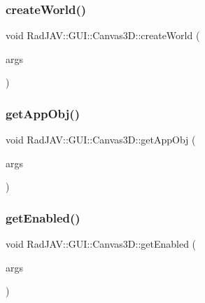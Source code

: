 \subsubsection{\texorpdfstring{create\+World()}{createWorld()}}
{\footnotesize\ttfamily void Rad\+J\+A\+V\+::\+G\+U\+I\+::\+Canvas3\+D\+::create\+World (\begin{DoxyParamCaption}\item[{const v8\+::\+Function\+Callback\+Info$<$ v8\+::\+Value $>$ \&}]{args }\end{DoxyParamCaption})\hspace{0.3cm}{\ttfamily [static]}}

\mbox{\label{class_rad_j_a_v_1_1_g_u_i_1_1_canvas3_d_af873318dd5011d56be49084e2fa8abfd}} 
\subsubsection{\texorpdfstring{get\+App\+Obj()}{getAppObj()}}
{\footnotesize\ttfamily void Rad\+J\+A\+V\+::\+G\+U\+I\+::\+Canvas3\+D\+::get\+App\+Obj (\begin{DoxyParamCaption}\item[{const v8\+::\+Function\+Callback\+Info$<$ v8\+::\+Value $>$ \&}]{args }\end{DoxyParamCaption})\hspace{0.3cm}{\ttfamily [static]}}

\mbox{\label{class_rad_j_a_v_1_1_g_u_i_1_1_canvas3_d_ac8b768c038924e40ae05d8057d061de4}} 
\subsubsection{\texorpdfstring{get\+Enabled()}{getEnabled()}}
{\footnotesize\ttfamily void Rad\+J\+A\+V\+::\+G\+U\+I\+::\+Canvas3\+D\+::get\+Enabled (\begin{DoxyParamCaption}\item[{const v8\+::\+Function\+Callback\+Info$<$ v8\+::\+Value $>$ \&}]{args }\end{DoxyParamCaption})\hspace{0.3cm}{\ttfamily [static]}}

